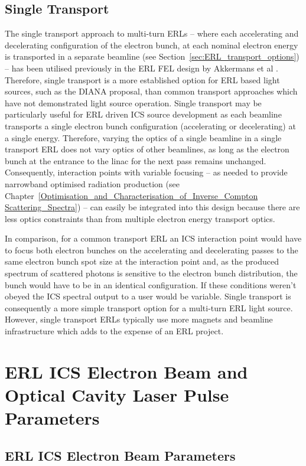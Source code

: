 \documentclass[../main.tex]{subfiles}
\begin{document}
\subsection{Single Transport}

The single transport approach to multi-turn ERLs -- where each accelerating and decelerating configuration of the electron bunch, at each nominal electron energy is transported in a separate beamline (see Section~\ref{sec:ERL_transport_options}) -- has been utilised previously in the ERL FEL design by Akkermans et al \cite{akkermans2017compact}. Therefore, single transport is a more established option for ERL based light sources, such as the DIANA proposal, than common transport approaches which have not demonstrated light source operation. Single transport may be particularly useful for ERL driven ICS source development as each beamline transports a single electron bunch configuration (accelerating or decelerating) at a single energy. Therefore, varying the optics of a single beamline in a single transport ERL does not vary optics of other beamlines, as long as the electron bunch at the entrance to the linac for the next pass remains unchanged. Consequently, interaction points with variable focusing -- as needed to provide narrowband optimised radiation production (see Chapter~\ref{Optimisation_and_Characterisation_of_Inverse_Compton Scattering_Spectra}) -- can easily be integrated into this design because there are less optics constraints than from multiple electron energy transport optics.

In comparison, for a common transport ERL an ICS interaction point would have to focus both electron bunches on the accelerating and decelerating passes to the same electron bunch spot size at the interaction point and, as the produced spectrum of scattered photons is sensitive to the electron bunch distribution, the bunch would have to be in an identical configuration. If these conditions weren't obeyed the ICS spectral output to a user would be variable. Single transport is consequently a more simple transport option for a multi-turn ERL light source. However, single transport ERLs typically use more magnets and beamline infrastructure which adds to the expense of an ERL project.

\section{ERL ICS Electron Beam and Optical Cavity Laser Pulse Parameters}

\subsection{ERL ICS Electron Beam Parameters }
\label{sec:DIANA_electron_parameters}
\end{document}
